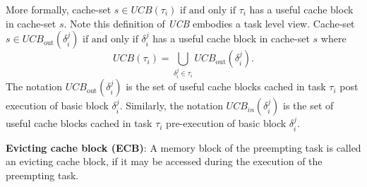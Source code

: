 \noindent More formally, cache-set \begin{math}s \in \textit{UCB}(\tau_{i})\textrm{ if and only if }\tau_{i}\end{math} has a useful cache block in cache-set $s$.  Note this definition of \textit{UCB} embodies a task level view.  Cache-set \begin{math}s \in \textit{UCB}_{\textrm{out}}(\delta_{i}^{j})\textrm{ if and only if }\delta_{i}^{j}\end{math} has a useful cache block in cache-set $s$ where
\begin{equation}\label{eqn:ucb-task}
    \textit{UCB}(\tau_{i}) = \bigcup_{\delta_{i}^{j} \in \tau_{i}} \textit{UCB}_{\textrm{out}}(\delta_{i}^{j}).
\end{equation}
\noindent The notation \begin{math}\textit{UCB}_{\textrm{out}}(\delta_{i}^{j})\end{math} is the set of useful cache blocks cached in task \begin{math}\tau_{i}\end{math} post execution of basic block \begin{math}\delta_{i}^{j}\end{math}.  Similarly, the notation \begin{math}\textit{UCB}_{in}(\delta_{i}^{j})\end{math} is the set of useful cache blocks cached in task \begin{math}\tau_{i}\end{math} pre-execution of basic block \begin{math}\delta_{i}^{j}\end{math}.

\begin{definition}
\textbf{Evicting cache block (ECB)}: A memory block of the preempting task is called an evicting cache block, if it may be accessed during the execution of the preempting task.
\end{definition}

